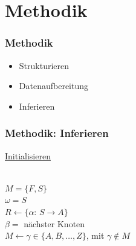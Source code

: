 \documentclass[12pt]{beamer}
\begin{document}
    \section{Methodik}
    \label{sec:methodik}
    \begin{frame}
        \frametitle{Methodik}

        \begin{itemize}
            \setlength\itemsep{1em}
            \item<1-> Strukturieren
            \item<2-> Datenaufbereitung
            \item<3-> Inferieren
        \end{itemize}
    \end{frame}

    \begin{frame}[allowframebreaks]
        \frametitle{Methodik: Inferieren}

        \underline{Initialisieren}\\
        ~\\
        \begin{algorithm}[H]
            $M=\{F,S\}$\\
            $\omega=S$\\
            $R \gets \{\alpha$: $S \rightarrow A\}$\\
            $\beta=$ nächster Knoten\\
            $M \gets \gamma \in \{A,B,\dots,Z\}$, mit $\gamma \notin M$\\
        \end{algorithm}

        \framebreak

        \begin{algorithm}[H]
        \end{algorithm}
    \end{frame}
\end{document}
